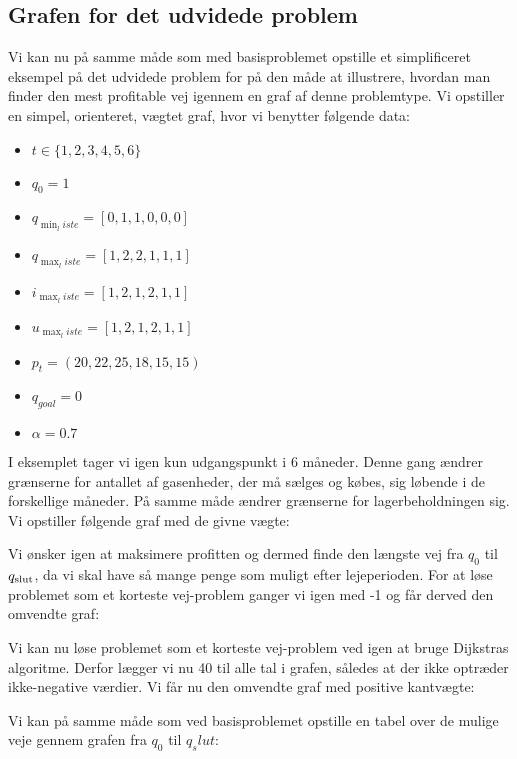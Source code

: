 \subsection{Grafen for det udvidede problem} \label{kap:grafen_for_udvidet}
Vi kan nu på samme måde som med basisproblemet opstille et simplificeret eksempel på det udvidede problem for på den måde at illustrere, hvordan man finder den mest profitable vej igennem en graf af denne problemtype. Vi opstiller en simpel, orienteret, vægtet graf, hvor vi benytter følgende data:

\begin{itemize}
  \item $t \in \{1,2,3,4,5,6\}$
  \item $q_{0}=1$
  \item $q_{\min_liste}=[0,1,1,0,0,0]$
  \item $q_{\max_liste}=[1,2,2,1,1,1]$
  \item $i_{\max_liste}=[1,2,1,2,1,1]$
  \item $u_{\max_liste}=[1,2,1,2,1,1]$
  \item $p_{t}=(20,22,25,18,15,15)$
  \item $q_{goal}=0$
  \item $\alpha=0.7$
\end{itemize}

I eksemplet tager vi igen kun udgangspunkt i 6 måneder. Denne gang ændrer grænserne for antallet af gasenheder, der må sælges og købes, sig løbende i de forskellige måneder. På samme måde ændrer grænserne for lagerbeholdningen sig. Vi opstiller følgende graf med de givne vægte:



Vi ønsker igen at maksimere profitten og dermed finde den længste vej fra $q_{0}$ til $q_{\textrm{slut}}$, da vi skal have så mange penge som muligt efter lejeperioden. For at løse problemet som et korteste vej-problem ganger vi igen med -1 og får derved den omvendte graf:



Vi kan nu løse problemet som et korteste vej-problem ved igen at bruge Dijkstras algoritme. Derfor lægger vi nu 40 til alle tal i grafen, således at der ikke optræder ikke-negative værdier. Vi får nu den omvendte graf med positive kantvægte:




Vi kan på samme måde som ved basisproblemet opstille en tabel over de mulige veje gennem grafen fra $q_0$ til $q_slut$:

